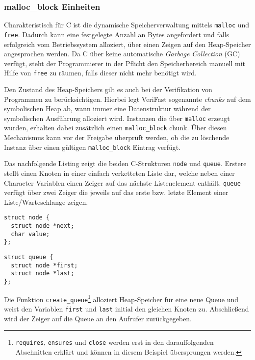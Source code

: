 \subsubsection{malloc\_block Einheiten}

Charakteristisch für C ist die dynamische Speicherverwaltung mittels \texttt{malloc} und \texttt{free}. Dadurch kann eine festgelegte Anzahl an Bytes angefordert und falls erfolgreich vom Betriebssystem alloziert, über einen Zeigen auf den Heap-Speicher angesprochen werden. Da C über keine automatische \emph{Garbage Collection} (GC) verfügt, steht der Programmierer in der Pflicht den Speicherbereich manuell mit Hilfe von \texttt{free} zu räumen, falls dieser nicht mehr benötigt wird.

Den Zustand des Heap-Speichers gilt es auch bei der Verifikation von Programmen zu berücksichtigen. Hierbei legt VeriFast sogenannte \emph{chunks} auf dem symbolischen Heap ab, wann immer eine Datenstruktur während der symbolischen Ausführung alloziert wird. Instanzen die über \texttt{malloc} erzeugt wurden, erhalten dabei zusätzlich einen \texttt{malloc\_block} chunk. Über diesen Mechanismus kann vor der Freigabe überprüft werden, ob die zu löschende Instanz über einen gültigen \texttt{malloc\_block} Eintrag verfügt. \cite{Jacobs2008,Jacobs2010}

Das nachfolgende Listing zeigt die beiden C-Strukturen \texttt{node} und \texttt{queue}. Erstere stellt einen Knoten in einer einfach verketteten Liste dar, welche neben einer Character Variablen einen Zeiger auf das nächste Listenelement enthält. \texttt{queue} verfügt über zwei Zeiger die jeweils auf das erste bzw. letzte Element einer Liste/Warteschlange zeigen.

\noindent
\begin{minipage}{.45\textwidth}
\begin{lstlisting}
struct node {
  struct node *next;
  char value;
};
\end{lstlisting}
\end{minipage}
\hfill
\begin{minipage}{.45\textwidth}
\begin{lstlisting}
struct queue {
  struct node *first;
  struct node *last;
};
\end{lstlisting}
\end{minipage}

\noindent
Die Funktion \texttt{create\_queue}\footnote{\texttt{requires}, \texttt{ensures} und \texttt{close} werden erst in den darauffolgenden Abschnitten erklärt und können in diesem Beispiel übersprungen werden.} alloziert Heap-Speicher für eine neue Queue und weist den Variablen \texttt{first} und \texttt{last} initial den gleichen Knoten zu. Abschließend wird der Zeiger auf die Queue an den Aufrufer zurückgegeben. 

